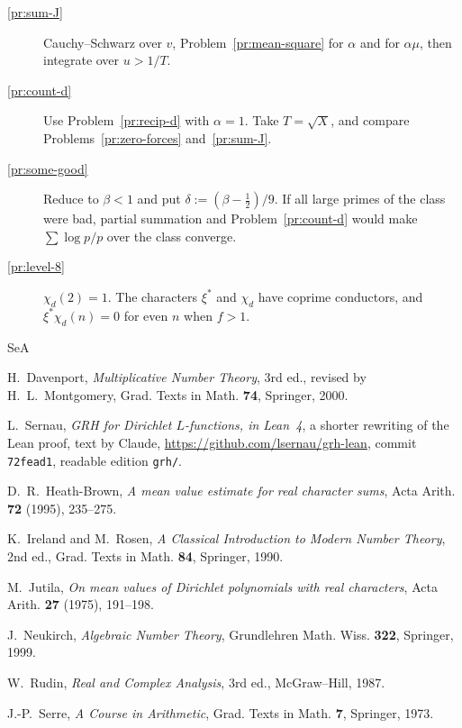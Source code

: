 \documentclass[reqno]{amsart}
\theoremstyle{definition}
\theoremstyle{plain}
\theoremstyle{remark}
\begin{document}
\begin{description}
\item[\ref{pr:sum-J}] Cauchy--Schwarz over $v$, Problem~\ref{pr:mean-square} for $\alpha$ and for $\alpha\mu$, then integrate over $u > 1/T$.
\item[\ref{pr:count-d}] Use Problem~\ref{pr:recip-d} with $\alpha = 1$.  Take $T = \sqrt X$, and compare Problems~\ref{pr:zero-forces} and~\ref{pr:sum-J}.
\item[\ref{pr:some-good}] Reduce to $\beta < 1$ and put $\delta := (\beta - \frac12)/9$.  If all large primes of the class were bad, partial summation and Problem~\ref{pr:count-d} would make $\sum \log p/p$ over the class converge.
\item[\ref{pr:level-8}] $\chi_d(2) = 1$.  The characters $\xi^*$ and $\chi_d$ have coprime conductors, and $\xi^*\chi_d(n) = 0$ for even $n$ when $f > 1$.
\end{description}

\begin{thebibliography}{SeA}

H.~Davenport, \emph{Multiplicative Number Theory}, 3rd ed., revised by H.~L.~Montgomery, Grad. Texts in Math. \textbf{74}, Springer, 2000.

 L.~Sernau, \emph{GRH for Dirichlet \(L\)-functions, in Lean~4}, a shorter rewriting of the Lean proof, text by Claude, \url{https://github.com/lsernau/grh-lean}, commit \texttt{72fead1}, readable edition \texttt{grh/}.

D.~R.~Heath-Brown, \emph{A mean value estimate for real character sums}, Acta Arith. \textbf{72} (1995), 235--275.

K.~Ireland and M.~Rosen, \emph{A Classical Introduction to Modern Number Theory}, 2nd ed., Grad. Texts in Math. \textbf{84}, Springer, 1990.

M.~Jutila, \emph{On mean values of Dirichlet polynomials with real characters}, Acta Arith. \textbf{27} (1975), 191--198.

J.~Neukirch, \emph{Algebraic Number Theory}, Grundlehren Math. Wiss. \textbf{322}, Springer, 1999.

W.~Rudin, \emph{Real and Complex Analysis}, 3rd ed., McGraw--Hill, 1987.

J.-P.~Serre, \emph{A Course in Arithmetic}, Grad. Texts in Math. \textbf{7}, Springer, 1973.

\end{thebibliography}
\end{document}
